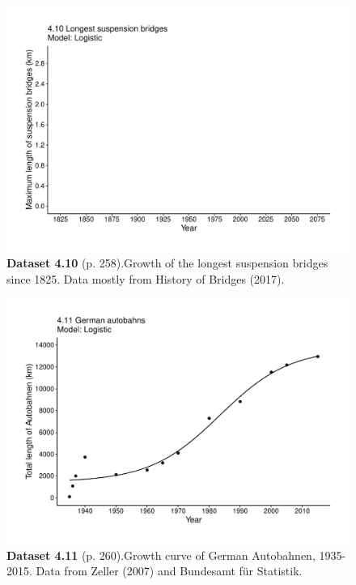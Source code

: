 \documentclass[aps,rmp,preprint,superscriptaddress,10pt,onecolumn]{article}
\begin{document}
\clearpage
\begin{figure}[h]
\includegraphics[width=\textwidth]{output/figs-ggplot/4.10.pdf}
\caption*{\textbf{Dataset 4.10} (p. 258).Growth of the longest suspension bridges since 1825. Data mostly from History of Bridges (2017).}
\end{figure}
	
\clearpage
\begin{figure}[h]
\includegraphics[width=\textwidth]{output/figs-ggplot/4.11.pdf}
\caption*{\textbf{Dataset 4.11} (p. 260).Growth curve of German Autobahnen, 1935-2015. Data from Zeller (2007) and Bundesamt für Statistik.}
\end{figure}
	
\end{document}
